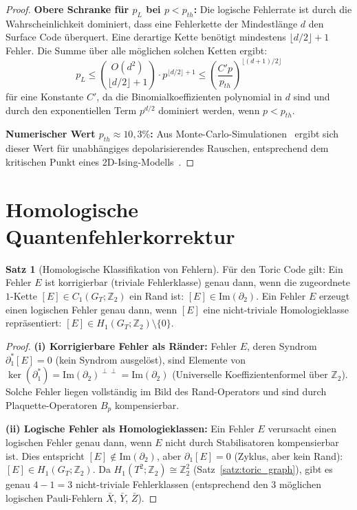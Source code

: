 ﻿\documentclass[a4paper,12pt]{article}
\theoremstyle{definition}
\newtheorem{satz}{Satz}
\begin{document}
\begin{proof}
\textbf{Obere Schranke f\"ur $p_L$ bei $p < p_{th}$:}
Die logische Fehlerrate ist durch die Wahrscheinlichkeit dominiert, dass
eine Fehlerkette der Mindestl\"ange $d$ den Surface Code \"uberquert.
Eine derartige Kette ben\"otigt mindestens $\lfloor d/2 \rfloor + 1$ Fehler.
Die Summe \"uber alle m\"oglichen solchen Ketten ergibt:
\[
p_L \leq \binom{O(d^2)}{\lfloor d/2 \rfloor+1}
\cdot p^{\lfloor d/2 \rfloor+1}
\leq \left(\frac{C' p}{p_{th}}\right)^{\lfloor(d+1)/2\rfloor}
\]
f\"ur eine Konstante $C'$, da die Binomialkoeffizienten polynomial in $d$ sind
und durch den exponentiellen Term $p^{d/2}$ dominiert werden, wenn $p < p_{th}$.

\textbf{Numerischer Wert $p_{th} \approx 10{,}3\%$:}
Aus Monte-Carlo-Simulationen~\cite{dennis2002} ergibt sich dieser Wert
f\"ur unabh\"angiges depolarisierendes Rauschen, entsprechend dem
kritischen Punkt eines 2D-Ising-Modells~\cite{dennis2002}.
\end{proof}

\section{Homologische Quantenfehlerkorrektur}

\begin{satz}[Homologische Klassifikation von Fehlern]
\label{satz:homologie}
F\"ur den Toric Code gilt: Ein Fehler $E$ ist korrigierbar (triviale Fehlerklasse)
genau dann, wenn die zugeordnete $1$-Kette $[E] \in C_1(G_T; \mathbb{Z}_2)$
ein Rand ist: $[E] \in \mathrm{Im}(\partial_2)$.
Ein Fehler $E$ erzeugt einen logischen Fehler genau dann, wenn $[E]$
eine nicht-triviale Homologieklasse repr\"asentiert:
$[E] \in H_1(G_T; \mathbb{Z}_2) \setminus \{0\}$.
\end{satz}

\begin{proof}
\textbf{(i) Korrigierbare Fehler als R\"ander:}
Fehler $E$, deren Syndrom $\partial_1^* [E] = 0$ (kein Syndrom ausge\-l\"ost),
sind Elemente von $\ker(\partial_1^*) = \mathrm{Im}(\partial_2)^{\perp\perp}
= \mathrm{Im}(\partial_2)$ (Universelle Koeffizientenformel \"uber $\mathbb{Z}_2$).
Solche Fehler liegen vollst\"andig im Bild des Rand-Operators und sind
durch Plaquette-Operatoren $B_p$ kompensierbar.

\textbf{(ii) Logische Fehler als Homologieklassen:}
Ein Fehler $E$ verursacht einen logischen Fehler genau dann, wenn $E$
nicht durch Stabilisatoren kompensierbar ist. Dies entspricht
$[E] \notin \mathrm{Im}(\partial_2)$, aber $\partial_1 [E] = 0$
(Zyklus, aber kein Rand): $[E] \in H_1(G_T; \mathbb{Z}_2)$.
Da $H_1(T^2; \mathbb{Z}_2) \cong \mathbb{Z}_2^2$ (Satz~\ref{satz:toric_graph}),
gibt es genau $4 - 1 = 3$ nicht-triviale Fehlerklassen (entsprechend den
3 m\"oglichen logischen Pauli-Fehlern $\bar{X}$, $\bar{Y}$, $\bar{Z}$).
\end{proof}
\end{document}
